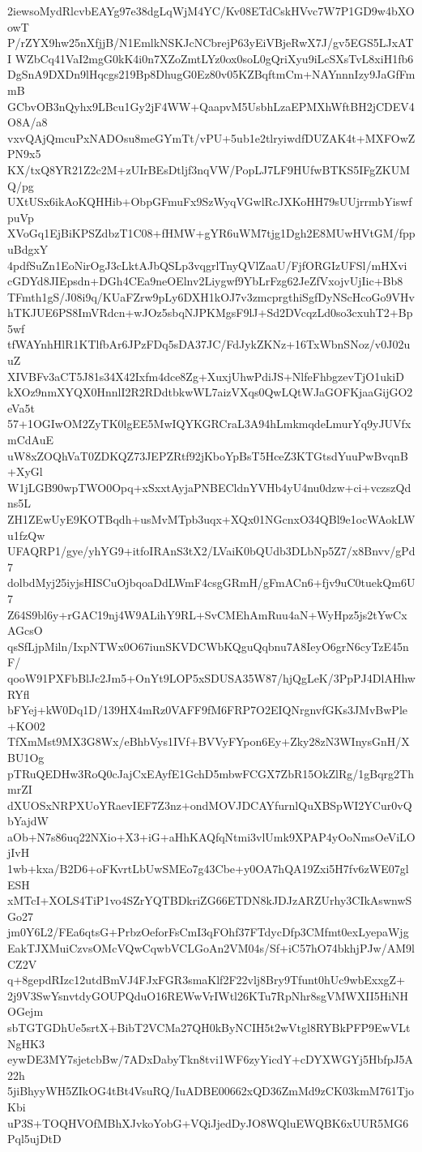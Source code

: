 2iewsoMydRlcvbEAYg97e38dgLqWjM4YC/Kv08ETdCskHVvc7W7P1GD9w4bXOowT
P/rZYX9hw25nXfjjB/N1EmlkNSKJcNCbrejP63yEiVBjeRwX7J/gv5EGS5LJxATI
WZbCq41VaI2mgG0kK4i0n7XZoZmtLYz0ox0soL0gQriXyu9iLcSXsTvL8xiH1fb6
DgSnA9DXDn9lHqcgs219Bp8DhugG0Ez80v05KZBqftmCm+NAYnnnIzy9JaGfFmmB
GCbvOB3nQyhx9LBcu1Gy2jF4WW+QaapvM5UsbhLzaEPMXhWftBH2jCDEV4O8A/a8
vxvQAjQmcuPxNADOsu8meGYmTt/vPU+5ub1e2tlryiwdfDUZAK4t+MXFOwZPN9x5
KX/txQ8YR21Z2c2M+zUIrBEsDtljf3nqVW/PopLJ7LF9HUfwBTKS5IFgZKUMQ/pg
UXtUSx6ikAoKQHHib+ObpGFmuFx9SzWyqVGwlRcJXKoHH79sUUjrrmbYiswfpuVp
XVoGq1EjBiKPSZdbzT1C08+fHMW+gYR6uWM7tjg1Dgh2E8MUwHVtGM/fppuBdgxY
4pdfSuZn1EoNirOgJ3cLktAJbQSLp3vqgrlTnyQVlZaaU/FjfORGIzUFSl/mHXvi
cGDYd8JIEpsdn+DGh4CEa9neOElnv2Liygwf9YbLrFzg62JeZfVxojvUjIic+Bb8
TFmth1gS/J08i9q/KUaFZrw9pLy6DXH1kOJ7v3zmcprgthiSgfDyNScHcoGo9VHv
hTKJUE6PS8ImVRdcn+wJOz5sbqNJPKMgsF9lJ+Sd2DVcqzLd0so3cxuhT2+Bp5wf
tfWAYnhHlR1KTlfbAr6JPzFDq5sDA37JC/FdJykZKNz+16TxWbnSNoz/v0J02uuZ
XIVBFv3aCT5J81s34X42Ixfm4dce8Zg+XuxjUhwPdiJS+NlfeFhbgzevTjO1ukiD
kXOz9nmXYQX0HnnlI2R2RDdtbkwWL7aizVXqs0QwLQtWJaGOFKjaaGijGO2eVa5t
57+1OGIwOM2ZyTK0lgEE5MwIQYKGRCraL3A94hLmkmqdeLmurYq9yJUVfxmCdAuE
uW8xZOQhVaT0ZDKQZ73JEPZRtf92jKboYpBsT5HceZ3KTGtsdYuuPwBvqnB+XyGl
W1jLGB90wpTWO0Opq+xSxxtAyjaPNBECldnYVHb4yU4nu0dzw+ci+vczszQdns5L
ZH1ZEwUyE9KOTBqdh+usMvMTpb3uqx+XQx01NGcnxO34QBl9e1ocWAokLWu1fzQw
UFAQRP1/gye/yhYG9+itfoIRAnS3tX2/LVaiK0bQUdb3DLbNp5Z7/x8Bnvv/gPd7
dolbdMyj25iyjsHISCuOjbqoaDdLWmF4csgGRmH/gFmACn6+fjv9uC0tuekQm6U7
Z64S9bl6y+rGAC19nj4W9ALihY9RL+SvCMEhAmRuu4aN+WyHpz5js2tYwCxAGcsO
qsSfLjpMiln/IxpNTWx0O67iunSKVDCWbKQguQqbnu7A8IeyO6grN6cyTzE45nF/
qooW91PXFbBlJc2Jm5+OnYt9LOP5xSDUSA35W87/hjQgLeK/3PpPJ4DlAHhwRYfl
bFYej+kW0Dq1D/139HX4mRz0VAFF9fM6FRP7O2EIQNrgnvfGKs3JMvBwPle+KO02
TfXmMst9MX3G8Wx/eBhbVys1IVf+BVVyFYpon6Ey+Zky28zN3WInysGnH/XBU1Og
pTRuQEDHw3RoQ0cJajCxEAyfE1GchD5mbwFCGX7ZbR15OkZlRg/1gBqrg2ThmrZI
dXUOSxNRPXUoYRaevIEF7Z3nz+ondMOVJDCAYfurnlQuXBSpWI2YCur0vQbYajdW
aOb+N7s86uq22NXio+X3+iG+aHhKAQfqNtmi3vlUmk9XPAP4yOoNmsOeViLOjIvH
1wb+kxa/B2D6+oFKvrtLbUwSMEo7g43Cbe+y0OA7hQA19Zxi5H7fv6zWE07glESH
xMTcI+XOLS4TiP1vo4SZrYQTBDkriZG66ETDN8kJDJzARZUrhy3CIkAswnwSGo27
jm0Y6L2/FEa6qtsG+PrbzOeforFsCmI3qFOhf37FTdycDfp3CMfmt0exLyepaWjg
EakTJXMuiCzvsOMcVQwCqwbVCLGoAn2VM04s/Sf+iC57hO74bkhjPJw/AM9lCZ2V
q+8gepdRIzc12utdBmVJ4FJxFGR3smaKlf2F22vlj8Bry9Tfunt0hUc9wbExxgZ+
2j9V3SwYsnvtdyGOUPQduO16REWwVrIWtl26KTu7RpNhr8sgVMWXII5HiNHOGejm
sbTGTGDhUe5srtX+BibT2VCMa27QH0kByNCIH5t2wVtgl8RYBkPFP9EwVLtNgHK3
eywDE3MY7sjetcbBw/7ADxDabyTkn8tvi1WF6zyYicdY+cDYXWGYj5HbfpJ5A22h
5jiBhyyWH5ZIkOG4tBt4VsuRQ/IuADBE00662xQD36ZmMd9zCK03kmM761TjoKbi
uP3S+TOQHVOfMBhXJvkoYobG+VQiJjedDyJO8WQluEWQBK6xUUR5MG6Pql5ujDtD
